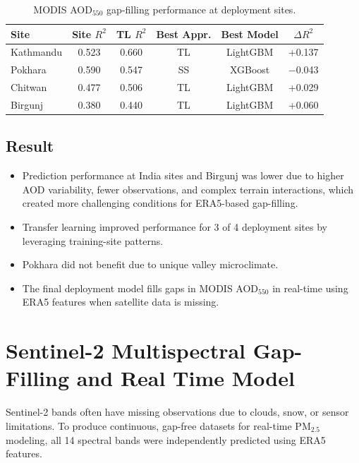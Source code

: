 \documentclass[12pt]{report}
\begin{document}
\begin{table}[H]
\centering
\caption{MODIS AOD$_{550}$ gap-filling performance at deployment sites.}
\label{tab:modis_deployment}
\vspace{.3cm}
\begin{tabular}{|l|c|c|c|c|c|}
\hline
\textbf{Site }     & \textbf{Site $R^2$} &\textbf{ TL $R^2$} & \textbf{Best Appr.} & \textbf{Best Model} & $\Delta R^2$ \\
\hline
Kathmandu & 0.523      & 0.660    & TL         & LightGBM       & +0.137 \\
\hline
Pokhara   & 0.590      & 0.547    & SS         & XGBoost        & −0.043 \\
\hline
Chitwan   & 0.477      & 0.506    & TL         & LightGBM       & +0.029 \\
\hline
Birgunj   & 0.380      & 0.440    & TL         & LightGBM       & +0.060 \\
\hline
\end{tabular}
\par\vspace{0.2cm}
\end{table}


\subsection{Result}
\begin{itemize}
\item Prediction performance at India sites and Birgunj was lower due to higher AOD variability, fewer observations, and complex terrain interactions, which created more challenging conditions for ERA5-based gap-filling.
    \item Transfer learning improved performance for 3 of 4 deployment sites by leveraging training-site patterns.  
    \item Pokhara did not benefit due to unique valley microclimate.  
    \item The final deployment model fills gaps in MODIS AOD$_{550}$ in real-time using ERA5 features when satellite data is missing.
\end{itemize}

\section{Sentinel-2 Multispectral Gap-Filling and Real Time Model}

Sentinel-2 bands often have missing observations due to clouds, snow, or sensor limitations. To produce continuous, gap-free datasets for real-time PM$_{2.5}$ modeling, all 14 spectral bands were independently predicted using ERA5 features.
\end{document}
